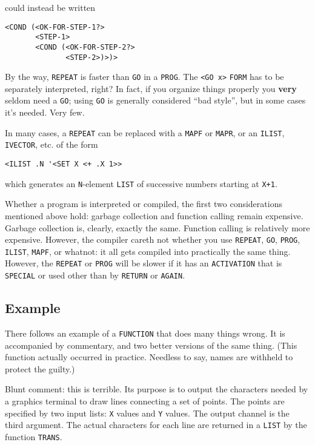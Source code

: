 \documentclass[a4paper]{scrbook}
\begin{document}
could instead be written

\begin{verbatim}
<COND (<OK-FOR-STEP-1?>
       <STEP-1>
       <COND (<OK-FOR-STEP-2?>
              <STEP-2>)>)>
\end{verbatim}

By the way, \texttt{REPEAT} is faster than \texttt{GO} in a \texttt{PROG}. The
\texttt{\textless{}GO\ x\textgreater{}} \texttt{FORM} has to be separately interpreted, right? In fact, if you organize
things properly you \textbf{very} seldom need a \texttt{GO}; using \texttt{GO} is generally considered ``bad style'', but
in some cases it's needed. Very few.

In many cases, a \texttt{REPEAT} can be replaced with a \texttt{MAPF} or \texttt{MAPR}, or an
\texttt{ILIST}, \texttt{IVECTOR}, etc. of the form

\begin{verbatim}
<ILIST .N '<SET X <+ .X 1>>
\end{verbatim}

which generates an \texttt{N}-element \texttt{LIST} of successive numbers starting at \texttt{X+1}.

Whether a program is interpreted or compiled, the first two considerations mentioned above hold: garbage collection and
function calling remain expensive. Garbage collection is, clearly, exactly the same. Function calling is relatively more
expensive. However, the compiler careth not whether you use \texttt{REPEAT}, \texttt{GO}, \texttt{PROG}, \texttt{ILIST},
\texttt{MAPF}, or whatnot: it all gets compiled into practically the same thing. However, the \texttt{REPEAT} or
\texttt{PROG} will be slower if it has an \texttt{ACTIVATION}  that is \texttt{SPECIAL} or used
other than by \texttt{RETURN} or \texttt{AGAIN}.

\subsection{Example}\label{example-2}

There follows an example of a \texttt{FUNCTION} that does many things wrong. It is accompanied by commentary, and two
better versions of the same thing. (This function actually occurred in practice. Needless to say, names are withheld to
protect the guilty.)

Blunt comment: this is terrible. Its purpose is to output the characters needed by a graphics terminal to draw lines
connecting a set of points. The points are specified by two input lists: \texttt{X} values and \texttt{Y} values. The
output channel is the third argument. The actual characters for each line are returned in a \texttt{LIST} by the function
\texttt{TRANS}.
\end{document}
